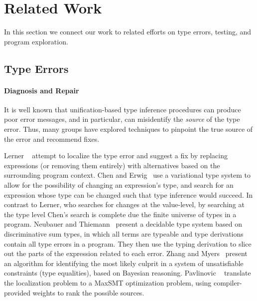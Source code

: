 \section{Related Work}
\label{sec:related-work}
In this section we connect our work to related efforts on type errors,
testing, and program exploration.

\subsection{Type Errors}
\label{sec:type-error}

\paragraph{Diagnosis and Repair}
\label{sec:diagnosis-repair}
It is well known that unification-based type inference procedures can
produce poor error messages, and in particular, can misidentify the
\emph{source} of the type error.
%
Thus, many groups have explored techniques to pinpoint the true source
of the error and recommend fixes.

Lerner \etal~\cite{lerner_searching_2007} attempt to localize the type
error and suggest a fix by replacing expressions (or removing them
entirely) with alternatives based on the surrounding program context.
%
Chen and Erwig~\cite{chen_counter-factual_2014} use a variational type
system to allow for the possibility of changing an expression's type,
and search for an expression whose type can be changed such that type
inference would succeed.
%
%
In contrast to Lerner, who searches for changes at the
value-level, by searching at the type level Chen's search is complete due
the finite universe of types in a program.
%
Neubauer and Thiemann~\cite{neubauer_discriminative_2003} present a
decidable type system based on discriminative sum types, in which all
terms are typeable and type derivations contain all type errors in a
program. They then use the typing derivation to slice out the parts of
the expression related to each error.
%
Zhang and Myers~\cite{zhang_toward_2014} present an algorithm for
identifying the most likely culprit in a system of unsatisfiable
constraints (\eg type equalities), based on Bayesian reasoning.
%
Pavlinovic \etal~\cite{pavlinovic_finding_2014} translate the %
localization problem to a MaxSMT optimization problem, using
compiler-provided weights to rank the possible sources.


